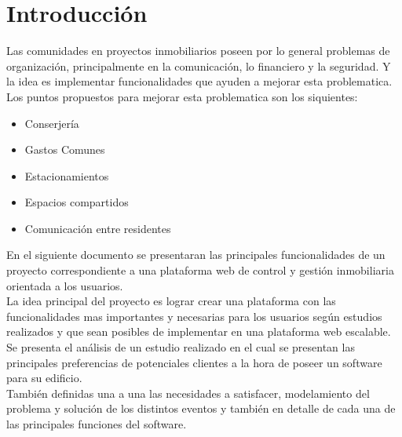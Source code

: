 \chapter{Introducción}
Las comunidades en proyectos inmobiliarios poseen por lo general problemas de organización, principalmente en la comunicación, lo financiero y la seguridad. Y la idea es implementar funcionalidades que ayuden a mejorar esta problematica.\\
Los puntos propuestos para mejorar esta problematica son los siquientes:
\begin{itemize}
\item Conserjería
\item Gastos Comunes
\item Estacionamientos
\item Espacios compartidos
\item Comunicación entre residentes 
\end{itemize}
En el siguiente documento se presentaran las principales funcionalidades de un proyecto correspondiente a una plataforma web de control y gestión inmobiliaria orientada a los usuarios.\\
La idea principal del proyecto es lograr crear una plataforma con las funcionalidades mas importantes y necesarias para los usuarios según estudios realizados y que sean posibles de implementar en una plataforma web escalable.\\
Se presenta el análisis de un estudio realizado en el cual se presentan las principales preferencias de potenciales clientes a la hora de poseer un software para su edificio.\\
También definidas una a una las necesidades a satisfacer, modelamiento del problema y solución de los distintos eventos y también en detalle de cada una de las principales funciones del software.
